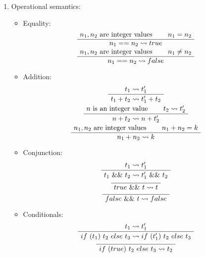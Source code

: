 \begin{exercise}{}
\begin{solution}
\begin{enumerate}
      \item Operational semantics:
      \begin{itemize}
        \item Equality:
          \begin{gather*}
            \AxiomC{\(n_1, n_2\) are integer values}
            \AxiomC{\(n_1 = n_2\)}
            \BinaryInfC{\(n_1 == n_2 \leadsto true\)}
            \DisplayProof \\
            \AxiomC{\(n_1, n_2\) are integer values}
            \AxiomC{\(n_1 \neq n_2\)}
            \BinaryInfC{\(n_1 == n_2 \leadsto false\)}
            \DisplayProof
          \end{gather*}
        \item Addition:
          \begin{gather*}
            \AxiomC{\(t_1 \leadsto t_1'\)}
            \UnaryInfC{\(t_1 + t_2 \leadsto t_1' + t_2\)}
            \DisplayProof \\
            \AxiomC{\(n\) is an integer value}
            \AxiomC{\(t_2 \leadsto t_2'\)}
            \BinaryInfC{\(n + t_2 \leadsto n + t_2'\)}
            \DisplayProof \\
            \AxiomC{\(n_1, n_2\) are integer values}
            \AxiomC{\(n_1 + n_2 = k\)}
            \BinaryInfC{\(n_1 + n_2 \leadsto k\)}
            \DisplayProof
          \end{gather*}
        \item Conjunction:
          \begin{gather*}
            \AxiomC{\(t_1 \leadsto t_1'\)}
            \UnaryInfC{\(t_1 ~\&\& ~t_2 \leadsto t_1' ~\&\& ~t_2\)}
            \DisplayProof \\
            \AxiomC{}
            \UnaryInfC{\(true ~\&\&~ t \leadsto t\)}
            \DisplayProof \\
            \AxiomC{}
            \UnaryInfC{\(false ~\&\&~ t \leadsto false\)}
            \DisplayProof
          \end{gather*}
        \item Conditionals:
          \begin{gather*}
            \AxiomC{\(t_1 \leadsto t_1'\)}
            \UnaryInfC{\(if ~(t_1) ~t_2 ~else ~t_3 \leadsto if ~(t_1') ~t_2 ~else ~t_3\)}
            \DisplayProof \\
            \AxiomC{}
            \UnaryInfC{\(if ~(true) ~t_2 ~else ~t_3 \leadsto t_2\)}
            \DisplayProof \\

\end{gather*}
\end{itemize}
\end{enumerate}
\end{solution}
\end{exercise}
